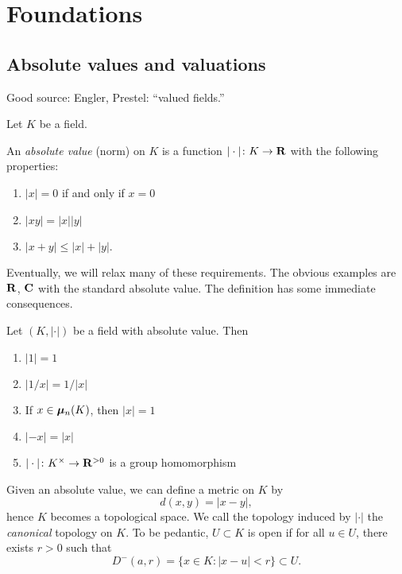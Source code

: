 
\section{Foundations}

\subsection{Absolute values and valuations}

Good source: Engler, Prestel: ``valued fields.''

Let $K$ be a field. 

\begin{definition}
An \emph{absolute value} (norm) on $K$ is a function $|\cdot|\colon K\to \mathbf{R}$ 
with the following properties: 
\begin{enumerate}
\item
$|x|=0$ if and only if $x=0$

\item
$|xy|=|x| |y|$

\item $|x+y|\leqslant |x|+|y|$. 
\end{enumerate}
\end{definition}

Eventually, we will relax many of these requirements. The obvious examples 
are $\mathbf{R}$, $\mathbf{C}$ with the standard absolute value. The definition has some 
immediate consequences. 

\begin{lemma}
Let $(K,|\cdot|)$ be a field with absolute value. Then 
\begin{enumerate}
\item $|1|=1$
\item $|1/x|=1/|x|$
\item If $x\in {\bm\mu}_n(K)$, then $|x|=1$
\item $|-x|=|x|$
\item $|\cdot|\colon K^\times\to \mathbf{R}^{>0}$ is a group homomorphism
\end{enumerate}
\end{lemma}

Given an absolute value, we can define a metric on $K$ by 
\[
  d(x,y) = |x-y| ,
\]
hence $K$ becomes a topological space. We call the topology induced by 
$|\cdot|$ the \emph{canonical} topology on $K$. To be pedantic, $U\subset K$ 
is open if for all $u\in U$, there exists $r>0$ such that 
\[
  D^-(a,r) = \{x\in K:|x-u|<r\}\subset U .
\]

